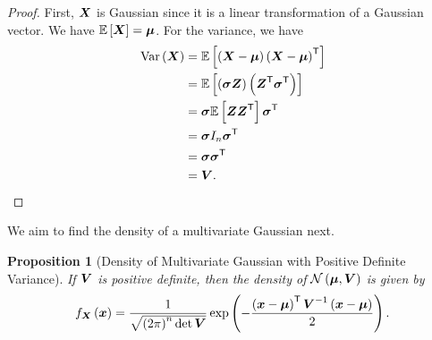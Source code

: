 \documentclass[11pt]{article}
\numberwithin{equation}{section}
\newtheorem{proposition}[theorem]{Proposition}
\theoremstyle{definition}
\theoremstyle{remark}
\newcommand{\pqty}[1]{\left(#1\right)}
\newcommand{\bqty}[1]{\left[#1\right]}
\newcommand{\inverse}{^{-1}}
\newcommand{\transpose}{^{\mathsf T}}
\newcommand{\Expt}{\mathbb E}
\DeclareMathOperator{\Var}{Var}
\newcommand{\identityM}{I}
\newcommand{\Normal}{\mathcal N}
\begin{document}
\begin{proof}\label{probability-proof-083}
    First, \(\vb{X}\) is Gaussian since it is a linear transformation of a Gaussian vector. We have \(\Expt\bqty{\vb{X}} = \vb*{\mu}\). For the variance, we have
    \begin{align*}
        \Var\pqty{\vb{X}} &= \Expt\bqty{\pqty{\vb{X} - \vb*{\mu}} \pqty{\vb{X} - \vb*{\mu}}\transpose} \\
        &= \Expt\bqty{\pqty{\vb*{\sigma} \vb{Z}} \pqty{\vb{Z}\transpose \vb*{\sigma}\transpose}} \\
        &= \vb*{\sigma} \Expt\bqty{\vb{Z} \vb{Z}\transpose} \vb*{\sigma}\transpose \\
        &= \vb*{\sigma} \identityM_n \vb*{\sigma}\transpose \\
        &= \vb*{\sigma} \vb*{\sigma}\transpose \\
        &= \vb{V}.
    \end{align*}
\end{proof}

We aim to find the density of a multivariate Gaussian next.

\begin{proposition}[Density of Multivariate Gaussian with Positive Definite Variance]\label{probability-proposition-043}
    If \(\vb{V}\) is positive definite, then the density of \(\Normal\pqty{\vb*{\mu}, \vb{V}}\) is given by
    \[
        f_{\vb{X}}\pqty{\vb{x}} = \frac{1}{\sqrt{\pqty{2\pi}^n \det \vb{V}}} \exp\pqty{- \frac{\pqty{\vb{x} - \vb*{\mu}}\transpose \vb{V}\inverse \pqty{\vb{x} - \vb*{\mu}}}{2}}.
    \]
\end{proposition}
\end{document}
